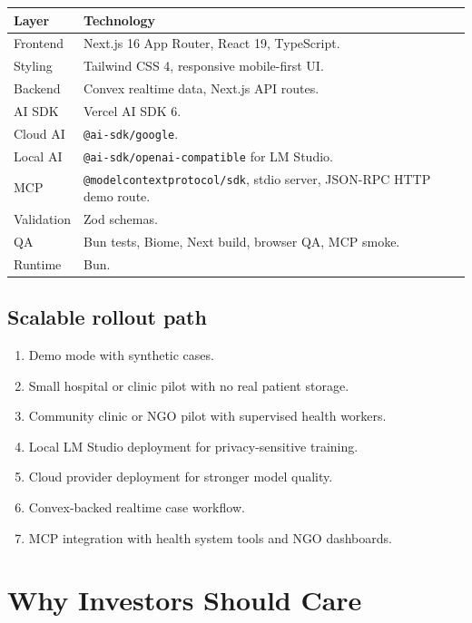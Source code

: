 \documentclass[11pt,letterpaper]{article}
\begin{document}
\begin{table}[H]
\centering
\begin{tabularx}{\linewidth}{@{}L{1.7in}Y@{}}
\toprule
\textbf{Layer} & \textbf{Technology} \\
\midrule
Frontend & Next.js 16 App Router, React 19, TypeScript. \\
Styling & Tailwind CSS 4, responsive mobile-first UI. \\
Backend & Convex realtime data, Next.js API routes. \\
AI SDK & Vercel AI SDK 6. \\
Cloud AI & \texttt{@ai-sdk/google}. \\
Local AI & \texttt{@ai-sdk/openai-compatible} for LM Studio. \\
MCP & \texttt{@modelcontextprotocol/sdk}, stdio server, JSON-RPC HTTP demo route. \\
Validation & Zod schemas. \\
QA & Bun tests, Biome, Next build, browser QA, MCP smoke. \\
Runtime & Bun. \\
\bottomrule
\end{tabularx}
\end{table}

\subsection{Scalable rollout path}

\begin{enumerate}
  \item Demo mode with synthetic cases.
  \item Small hospital or clinic pilot with no real patient storage.
  \item Community clinic or NGO pilot with supervised health workers.
  \item Local LM Studio deployment for privacy-sensitive training.
  \item Cloud provider deployment for stronger model quality.
  \item Convex-backed realtime case workflow.
  \item MCP integration with health system tools and NGO dashboards.
\end{enumerate}

\section{Why Investors Should Care}
\end{document}
